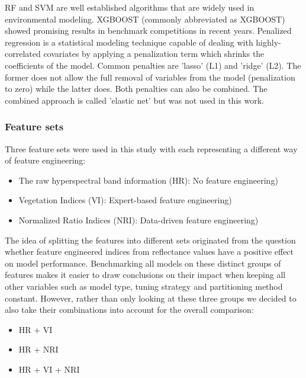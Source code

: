 \documentclass[letterpaper, peerreview]{IEEEtran}
\begin{document}
\noindent \ac{RF} and {SVM} are well established algorithms that are widely used in environmental modeling.
\ac{XGBOOST} (commonly abbreviated as XGBOOST) showed promising results in benchmark competitions in recent years.
Penalized regression is a statistical modeling technique capable of dealing with highly-correlated covariates by applying a penalization term which shrinks the coefficients of the model\cite{hastie2001}.
Common penalties are 'lasso' (L1) and 'ridge' (L2).
The former does not allow the full removal of variables from the model (penalization to zero) while the latter does.
Both penalties can also be combined.
The combined approach is called 'elastic net' but was not used in this work.

\subsubsection{Feature sets}

\noindent Three feature sets were used in this study with each representing a different way of feature engineering:

\begin{itemize}
	\item The raw hyperspectral band information (HR): No feature engineering) %
	\item Vegetation Indices (\ac{VI}): Expert-based feature engineering)
	\item Normalized Ratio Indices (\ac{NRI}): Data-driven feature engineering)
\end{itemize}

The idea of splitting the features into different sets originated from the question whether feature engineered indices from reflectance values have a positive effect on model performance.
Benchmarking all models on these distinct groups of features makes it easier to draw conclusions on their impact when keeping all other variables such as model type, tuning strategy and partitioning method constant.
However, rather than only looking at these three groups we decided to also take their combinations into account for the overall comparison:

\begin{itemize}
	\item HR + VI %
	\item HR + NRI
	\item HR + VI + NRI
\end{itemize}
\end{document}
